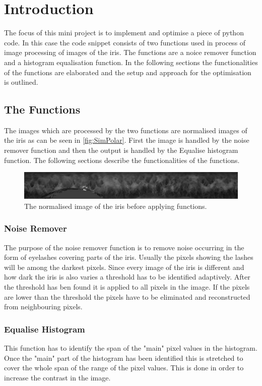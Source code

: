 \chapter{Introduction}
The focus of this mini project is to implement and optimise a piece of python code. 
In this case the code snippet consists of two functions used in process of image processing of images of the iris. The functions are a noice remover function and a histogram equalisation function. In the following sections the functionalities of the functions are elaborated and the setup and approach for the optimisation is outlined. 

\section{The Functions}
The images which are processed by the two functions are normalised images of the iris as can be seen in \autoref{fig:SimPolar}. First the image is handled by the noise remover function and then the output is handled by the Equalise histogram function. The following sections describe the functionalities of the functions. 
\begin{figure}[h]
\centering
\includegraphics[width=\textwidth]{figures/002polar.jpg}
\caption{The normalised image of the iris before applying functions.}
\label{fig:SimPolar}
\end{figure}


\subsection{Noise Remover}
The purpose of the noise remover function is to remove noise occurring in the form of eyelashes covering parts of the iris. Usually the pixels showing the lashes will be among the darkest pixels. Since every image of the iris is different and how dark the iris is also varies a threshold has to be identified adaptively. After the threshold has ben found it is applied to all pixels in the image. If the pixels are lower than the threshold the pixels have to be eliminated and reconstructed from neighbouring pixels.
  
\subsection{Equalise Histogram}
This function has to identify the span of the "main" pixel values in the histogram. Once the "main" part of the  histogram has been identified this is stretched to cover the whole span of the range of the pixel values. This is done in order to increase the contrast in the image.  

